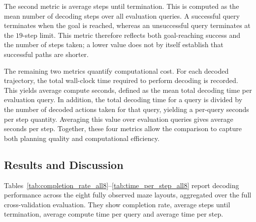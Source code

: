 ﻿\documentclass[12pt,a4paper]{article}
\theoremstyle{definition}
\begin{document}
The second metric is average steps until termination. This is computed as the mean number
of decoding steps over all evaluation queries. A successful query terminates when the goal
is reached, whereas an unsuccessful query terminates at the $19$-step limit. This metric
therefore reflects both goal-reaching success and the number of steps taken; a lower value
does not by itself establish that successful paths are shorter.

The remaining two metrics quantify computational cost. For each decoded trajectory, the total wall-clock
time required to perform decoding is recorded. This yields average compute seconds, defined
as the mean total decoding time per evaluation query. In addition, the total decoding time for a
query is divided by the number of decoded actions taken for that query, yielding a per-query seconds
per step quantity. Averaging this value over evaluation queries gives average seconds per
step. Together, these four metrics allow the comparison to capture both planning quality and
computational efficiency.

\subsection{Results and Discussion}

Tables~\ref{tab:completion_rate_all8}--\ref{tab:time_per_step_all8} report decoding performance across the eight fully observed maze layouts, aggregated over the
full cross-validation evaluation. They show completion rate, average steps until termination,
average compute time per query and average time per step.
\end{document}
